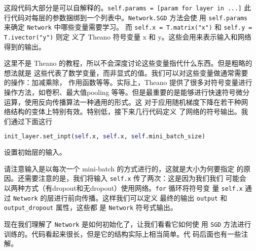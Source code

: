 这段代码大部分是可以自解释的。\lstinline!self.params = [param for layer in ...]!
此行代码对每层的参数捆绑到一个列表中。\lstinline!Network.SGD! 方法会使
用 \lstinline!self.params! 来确定 \lstinline!Network! 中哪些变量需要学习。
而 \lstinline!self.x = T.matrix("x")! 和 \lstinline!self.y = T.ivector("y")! 则定
义了 Theano 符号变量 x 和 y。这些会用来表示输入和网络得到的输出。

这里不是 Theano 的教程，所以不会深度讨论这些变量指代什么东西。但是粗略的想法就是
这些代表了数学变量，而非显式的值。我们可以对这些变量做通常需要的操作：加减乘除，
作用函数等等。实际上，Theano 提供了很多对符号变量进行操作方法，如卷积、最大值\gls*{pooling}
等等。但是最重要的是能够进行快速符号微分运算，使用反向传播算法一种通用的形式。这
对于应用随机梯度下降在若干种网络结构的变体上特别有效。特别低，接下来几行代码定义
了网络的符号输出。我们通过下面这行

\begin{lstlisting}[language=Python]
init_layer.set_inpt(self.x, self.x, self.mini_batch_size)
\end{lstlisting}

设置初始层的输入。

请注意输入是以每次一个 mini-batch 的方式进行的，这就是\minibatch{}大小为何要指定
的原因。还需要注意的是，我们将输入 \lstinline!self.x! 传了两次：这是因为我们我们
可能会以两种方式（有dropout和无dropout）使用网络。\lstinline!for! 循环将符号变
量 \lstinline!self.x! 通过 \lstinline!Network! 的层进行前向传播。这样我们可以定义
最终的输出 \lstinline!output! 和 \lstinline!output_dropout! 属性，这些都
是 \lstinline!Network! 符号式输出。

现在我们理解了 \lstinline!Network! 是如何初始化了，让我们看看它如何使
用 \lstinline!SGD! 方法进行训练的。代码看起来很长，但是它的结构实际上相当简单。代
码后面也有一些注解。

